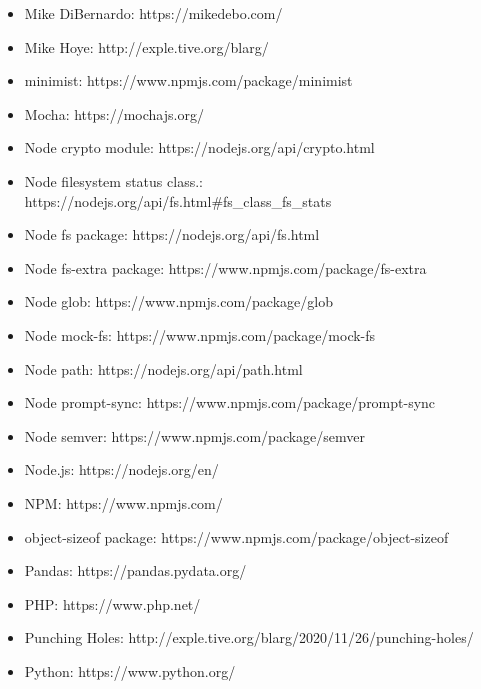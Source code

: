 \documentclass[krantzl]{krantz}
\begin{document}
\begin{itemize}
\item Mike DiBernardo: https://mikedebo.com/

\item Mike Hoye: http://exple.tive.org/blarg/

\item minimist: https://www.npmjs.com/package/minimist

\item Mocha: https://mochajs.org/

\item Node crypto module: https://nodejs.org/api/crypto.html

\item Node filesystem status class.: https://nodejs.org/api/fs.html\#fs\_class\_fs\_stats

\item Node fs package: https://nodejs.org/api/fs.html

\item Node fs-extra package: https://www.npmjs.com/package/fs-extra

\item Node glob: https://www.npmjs.com/package/glob

\item Node mock-fs: https://www.npmjs.com/package/mock-fs

\item Node path: https://nodejs.org/api/path.html

\item Node prompt-sync: https://www.npmjs.com/package/prompt-sync

\item Node semver: https://www.npmjs.com/package/semver

\item Node.js: https://nodejs.org/en/

\item NPM: https://www.npmjs.com/

\item object-sizeof package: https://www.npmjs.com/package/object-sizeof

\item Pandas: https://pandas.pydata.org/

\item PHP: https://www.php.net/

\item Punching Holes: http://exple.tive.org/blarg/2020/11/26/punching-holes/

\item Python: https://www.python.org/


\end{itemize}
\end{document}

